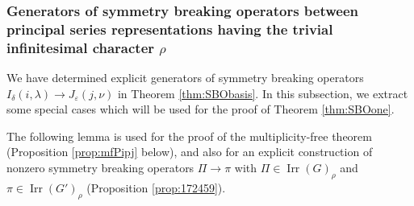\subsubsection{Generators of symmetry breaking operators
 between principal series representations
 having the trivial infinitesimal character $\rho$}
\label{subsec:StageBii}

We have determined explicit generators 
 of symmetry breaking operators
 $I_{\delta}(i,\lambda) \to J_{\varepsilon}(j,\nu)$
 in Theorem \ref{thm:SBObasis}.  
In this subsection,
 we extract some special cases
 which will be used for the proof of Theorem \ref{thm:SBOone}.   



The following lemma is used for the proof
 of the multiplicity-free theorem
 (Proposition \ref{prop:mfPipj} below), 
 and also for an explicit construction of nonzero symmetry breaking operators
 $\Pi \to \pi$ with $\Pi \in {\operatorname{Irr}}(G)_{\rho}$
 and $\pi \in {\operatorname{Irr}}(G')_{\rho}$
 (Proposition \ref{prop:172459}).  


